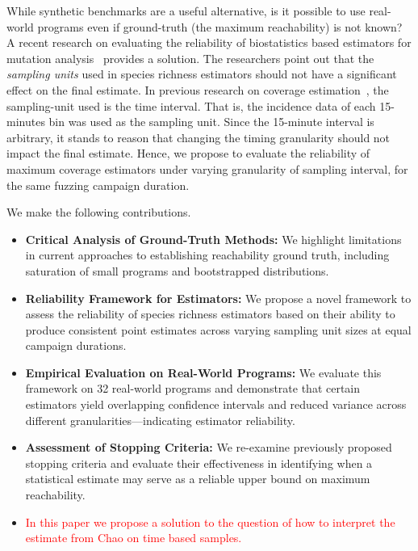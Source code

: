 \documentclass[conference]{IEEEtran}
\begin{document}
While synthetic benchmarks are a useful alternative, is it possible to use
real-world programs even if ground-truth (the maximum reachability) is not
known? A recent research on evaluating the reliability of biostatistics based
estimators for mutation analysis~\cite{kuznetsov2024empirical} provides a
solution. The researchers point out that the \emph{sampling units} used in
species richness estimators should not have a significant effect on the final
estimate. In previous research on coverage estimation~\cite{reachability_2023},
the sampling-unit used is the time interval. That is, the incidence data of
each 15-minutes bin was used as the sampling unit. Since the 15-minute interval
is arbitrary, it stands to reason that changing the timing granularity should
not impact the final estimate. Hence, we propose to evaluate the reliability of
maximum coverage estimators under varying granularity of sampling interval,
for the same fuzzing campaign duration.



We make the following contributions.

\begin{itemize}
    \item \textbf{Critical Analysis of Ground-Truth Methods:} We highlight limitations in current approaches to establishing reachability ground truth, including saturation of small programs and bootstrapped distributions.
    
    \item \textbf{Reliability Framework for Estimators:} We propose a novel framework to assess the reliability of species richness estimators based on their ability to produce consistent point estimates across varying sampling unit sizes at equal campaign durations.
    
    \item \textbf{Empirical Evaluation on Real-World Programs:} We evaluate this framework on 32 real-world programs and demonstrate that certain estimators yield overlapping confidence intervals and reduced variance across different granularities—indicating estimator reliability.
    
    \item \textbf{Assessment of Stopping Criteria:} We re-examine previously proposed stopping criteria and evaluate their effectiveness in identifying when a statistical estimate may serve as a reliable upper bound on maximum reachability.

    \item\textcolor{red}{In this paper we propose a solution to the question of how to interpret the estimate from Chao on time based samples.}
\end{itemize}
\end{document}
